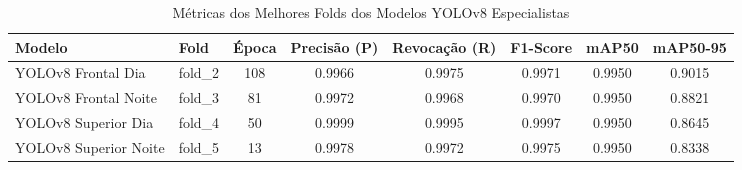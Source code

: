 \begin{table}[htbp]
\centering
\caption{Métricas dos Melhores Folds dos Modelos YOLOv8 Especialistas}
\label{tab:yolo_especialistas}
\begin{tabular}{llcccccc}
\hline
Modelo & Fold & Época & Precisão (P) & Revocação (R) & F1-Score & mAP50 & mAP50-95 \\
\hline
YOLOv8 Frontal Dia & fold\_2 & 108 & 0.9966 & 0.9975 & 0.9971 & 0.9950 & 0.9015 \\
YOLOv8 Frontal Noite & fold\_3 & 81 & 0.9972 & 0.9968 & 0.9970 & 0.9950 & 0.8821 \\
YOLOv8 Superior Dia & fold\_4 & 50 & 0.9999 & 0.9995 & 0.9997 & 0.9950 & 0.8645 \\
YOLOv8 Superior Noite & fold\_5 & 13 & 0.9978 & 0.9972 & 0.9975 & 0.9950 & 0.8338 \\
\hline
\end{tabular}
\end{table}